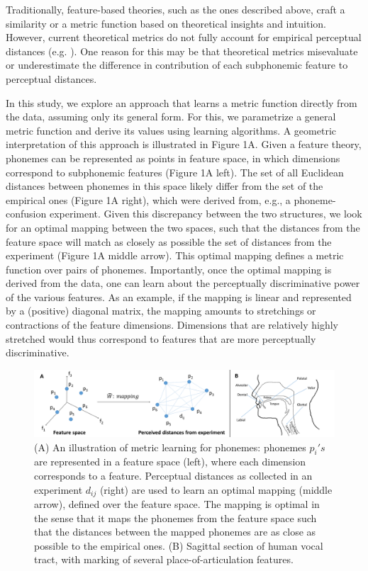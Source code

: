Traditionally, feature-based theories, such as the ones described above, craft a similarity or a metric function based on theoretical insights and intuition. However, current theoretical metrics do not fully account for empirical perceptual distances (e.g. \citealp{Bailey2005}). One reason for this may be that theoretical metrics misevaluate or underestimate the difference in contribution of each subphonemic feature to perceptual distances. 

In this study, we explore an approach that learns a metric function directly from the data, assuming only its general form. For this, we parametrize a general metric function and derive its values using learning algorithms. A geometric interpretation of this approach is illustrated in Figure 1A. Given a feature theory, phonemes can be represented as points in feature space, in which dimensions correspond to subphonemic features (Figure 1A left). The set of all Euclidean distances between phonemes in this space likely differ from the set of the empirical ones (Figure 1A right), which were derived from, e.g., a phoneme-confusion experiment. Given this discrepancy between the two structures, we look for an optimal mapping between the two spaces, such that the distances from the feature space will match as closely as possible the set of distances from the experiment (Figure 1A middle arrow). This optimal mapping defines a metric function over pairs of phonemes. Importantly, once the optimal mapping is derived from the data, one can learn about the perceptually discriminative power of the various features. As an example, if the mapping is linear and represented by a (positive) diagonal matrix, the mapping amounts to stretchings or contractions of the feature dimensions. Dimensions that are relatively highly stretched would thus correspond to features that are more perceptually discriminative.

\begin{figure}
\vspace{.3in}
\includegraphics[width=\linewidth]{Figures/Ch2/Figure1_new.png}
\caption{(A) An illustration of metric learning for phonemes: phonemes $p_i's$ are represented in a feature space (left), where each dimension corresponds to a feature. Perceptual distances as collected in an experiment $d_{ij}$ (right) are used to learn an optimal mapping (middle arrow), defined over the feature space. The mapping is optimal in the sense that it maps the phonemes from the feature space such that the distances between the mapped phonemes are as close as possible to the empirical ones. (B) Sagittal section of human vocal tract, with marking of several place-of-articulation features.}
\end{figure}

